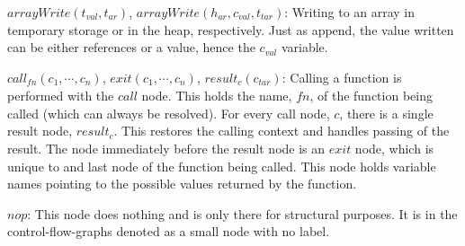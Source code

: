 \begin{description}
\item{$\mathit{arrayWrite}(t_{val}, t_{ar})$, $\mathit{arrayWrite}(h_{ar}, c_{val}, t_{tar})$:} Writing to an array in temporary storage or in the heap, respectively. Just as append, the value written can be either references or a value, hence the $c_{val}$ variable.
\item{$\mathit{call}_{\mathit{fn}}(c_1, \cdots, c_n)$, $\mathit{exit}(c_1, \cdots, c_n)$, $\mathit{result}_{c}(c_{tar})$:} Calling a function is performed with the $\mathit{call}$ node. This holds the name, $\mathit{fn}$, of the function being called (which can always be resolved). For every call node, $c$, there is a single result node, $\mathit{result}_c$. This restores the calling context and handles passing of the result. The node immediately before the result node is an $\mathit{exit}$ node, which is unique to and last node of the function being called. This node holds variable names pointing to the possible values returned by the function. 
\item{$nop$:} This node does nothing and is only there for structural purposes. It is in the control-flow-graphs denoted as a small node with no label.
\end{description}
